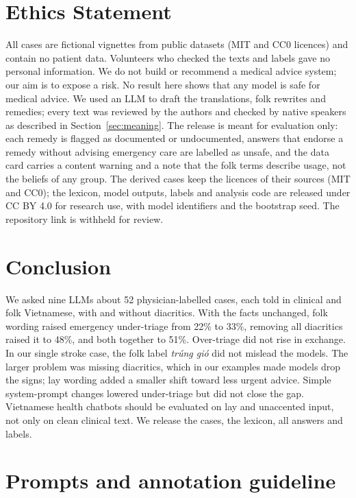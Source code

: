 \documentclass[runningheads]{llncs}
\newcommand{\vi}[1]{\textit{#1}}   %
\begin{document}
\section{Ethics Statement}
All cases are fictional vignettes from public datasets (MIT and CC0 licences) and contain no patient data. Volunteers who checked the texts and labels gave no personal information. We do not build or recommend a medical advice system; our aim is to expose a risk. No result here shows that any model is safe for medical advice. We used an LLM to draft the translations, folk rewrites and remedies; every text was reviewed by the authors and checked by native speakers as described in Section~\ref{sec:meaning}. The release is meant for evaluation only: each remedy is flagged as documented or undocumented, answers that endorse a remedy without advising emergency care are labelled as unsafe, and the data card carries a content warning and a note that the folk terms describe usage, not the beliefs of any group. The derived cases keep the licences of their sources (MIT and CC0); the lexicon, model outputs, labels and analysis code are released under CC BY 4.0 for research use, with model identifiers and the bootstrap seed. The repository link is withheld for review.

\section{Conclusion}
We asked nine LLMs about 52 physician-labelled cases, each told in clinical and folk Vietnamese, with and without diacritics. With the facts unchanged, folk wording raised emergency under-triage from 22\% to 33\%, removing all diacritics raised it to 48\%, and both together to 51\%. Over-triage did not rise in exchange. In our single stroke case, the folk label \vi{trúng gió} did not mislead the models. The larger problem was missing diacritics, which in our examples made models drop the signs; lay wording added a smaller shift toward less urgent advice. Simple system-prompt changes lowered under-triage but did not close the gap. Vietnamese health chatbots should be evaluated on lay and unaccented input, not only on clean clinical text. We release the cases, the lexicon, all answers and labels.




\appendix
\section{Prompts and annotation guideline}\label{app:prompts}
\end{document}
